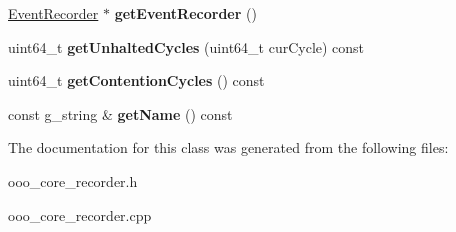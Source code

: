 \begin{DoxyCompactItemize}
\item 
\hypertarget{classOOOCoreRecorder_ad3da06397db838c7a84706565bef39a0}{\hyperlink{classEventRecorder}{Event\-Recorder} $\ast$ {\bfseries get\-Event\-Recorder} ()}\label{classOOOCoreRecorder_ad3da06397db838c7a84706565bef39a0}

\item 
\hypertarget{classOOOCoreRecorder_a41f9c7df626593718d934bc34b020c47}{uint64\-\_\-t {\bfseries get\-Unhalted\-Cycles} (uint64\-\_\-t cur\-Cycle) const }\label{classOOOCoreRecorder_a41f9c7df626593718d934bc34b020c47}

\item 
\hypertarget{classOOOCoreRecorder_ad209b06e7cd2a6179f48d285467fee21}{uint64\-\_\-t {\bfseries get\-Contention\-Cycles} () const }\label{classOOOCoreRecorder_ad209b06e7cd2a6179f48d285467fee21}

\item 
\hypertarget{classOOOCoreRecorder_a63d175b3d61168f486a00f47b70a2d58}{const g\-\_\-string \& {\bfseries get\-Name} () const }\label{classOOOCoreRecorder_a63d175b3d61168f486a00f47b70a2d58}

\end{DoxyCompactItemize}


The documentation for this class was generated from the following files\-:\begin{DoxyCompactItemize}
\item 
ooo\-\_\-core\-\_\-recorder.\-h\item 
ooo\-\_\-core\-\_\-recorder.\-cpp\end{DoxyCompactItemize}
